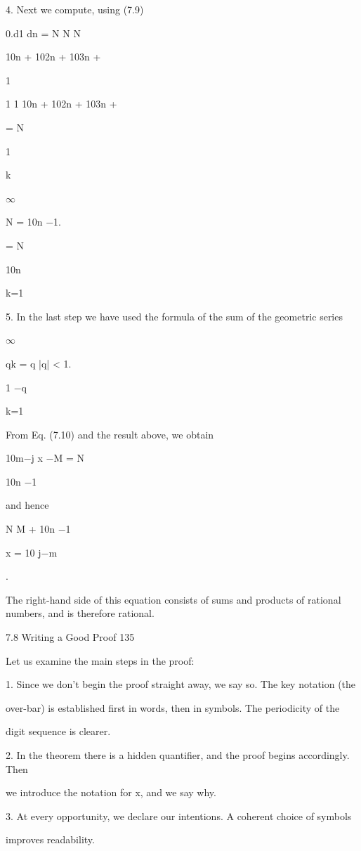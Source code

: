 \documentclass[11pt]{article}
\theoremstyle{plain}
\theoremstyle{definition}
\begin{document}
4. Next we compute, using (7.9)

0.d1 \textperiodcentered{} \textperiodcentered{} \textperiodcentered{} dn = N N N

10n + 102n + 103n + \textperiodcentered{} \textperiodcentered{} \textperiodcentered{}

1

1 1 10n + 102n + 103n + \textperiodcentered{} \textperiodcentered{} \textperiodcentered{}

= N

1

k

$\infty$

N = 10n $-$1.

= N

10n

k=1

5. In the last step we have used the formula of the sum of the geometric series

$\infty$

qk = q |q| < 1.

1 $-$q

k=1

From Eq. (7.10) and the result above, we obtain

10m$-$j x $-$M = N

10n $-$1

and hence

N M + 10n $-$1

x = 10 j$-$m

.

The right-hand side of this equation consists of sums and products of rational numbers, and is therefore rational. 

7.8 Writing a Good Proof 135

Let us examine the main steps in the proof:

1. Since we don't begin the proof straight away, we say so. The key notation (the

over-bar) is established first in words, then in symbols. The periodicity of the

digit sequence is clearer.

2. In the theorem there is a hidden quantifier, and the proof begins accordingly. Then

we introduce the notation for x, and we say why.

3. At every opportunity, we declare our intentions. A coherent choice of symbols

improves readability.
\end{document}
